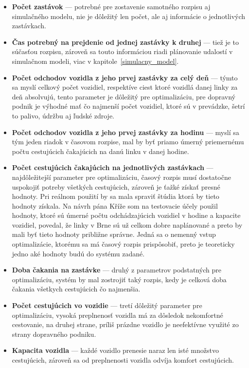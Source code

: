 \begin{itemize}
  \item \textbf{Počet zastávok} --- potrebné pre zostavenie samotného rozpisu aj simulačného modelu, nie je dôležitý len počet, ale aj informácie o jednotlivých zastávkach.
  \item \textbf{Čas potrebný na prejdenie od jednej zastávky k druhej} --- tiež je to súčasťou rozpisu, zároveň sa touto informáciou riadi plánovanie udalostí v simulačnom modeli, viac v kapitole~\ref{simulacny_model}.
  \item \textbf{Počet odchodov vozidla z jeho prvej zastávky za celý deň} --- týmto sa myslí celkový počet vozidiel, respektíve ciest ktoré vozidlá danej linky za deň absolvujú, tento parameter je dôležitý pre optimalizáciu, pre dopravný podnik je výhodné mať čo najmenší počet vozidiel, ktoré sú v prevádzke, šetrí to palivo, údržbu aj ľudské zdroje.
  \item \textbf{Počet odchodov vozidla z jeho prvej zastávky za hodinu} --- myslí sa tým jeden riadok v časovom rozpise, mal by byť priamo úmerný priemernému počtu cestujúcich čakajúcich na danú linku v danej hodine.
  \item \textbf{Počet cestujúcich čakajúcich na jednotlivých zastávkach} --- najdôležitejší parameter pre optimalizáciu, časový rozpis musí dostatočne uspokojiť potreby všetkých cestujúcich, zároveň je ťažké získať presné hodnoty. Pri reálnom použití by sa mala spraviť štúdia ktorá by tieto hodnoty získala. Na návrh pána Kříže som na testovacie účely použil hodnoty, ktoré sú úmerné počtu odchádzajúcich vozidiel v hodine a kapacite vozidiel, povedal, že linky v Brne sú už celkom dobre naplánované a preto by mali byť tieto hodnoty približne správne. Jedná sa o nemenný vstup optimalizácie, ktorému sa má časový rozpis prispôsobiť, preto je teoreticky jedno aké hodnoty budú do systému zadané.
  \item \textbf{Doba čakania na zastávke} --- druhý z parametrov podstatných pre optimalizáciu, systém by mal zostrojiť taký rozpis, kedy je celková doba čakania všetkych cestujúcich čo najmenšia.
  \item \textbf{Počet cestujúcich vo vozidie} --- tretí dôležitý parameter pre optimalizáciu, vysoká preplnenosť vozidla má za dôsledok nekomfortné cestovanie, na druhej strane, príliš prázdne vozidlo je neefektívne využité zo strany dopravného podniku.
  \item \textbf{Kapacita vozidla} --- každé vozidlo prenesie naraz len isté množstvo cestujúcich, zároveň sa od preplnenosti vozidla odvíja komfort cestujúcich.

\end{itemize}
